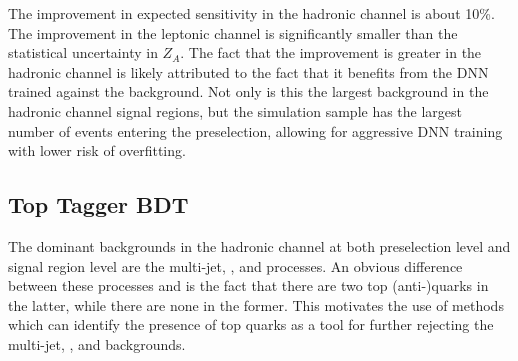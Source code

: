 The improvement in expected sensitivity in the hadronic channel is about 10\%.
The improvement in the leptonic channel is significantly smaller than the statistical uncertainty in $Z_A$.
The fact that the improvement is greater in the hadronic channel is likely attributed to the fact that it benefits from the DNN trained against the \dipho background.
Not only is this the largest background in the \ttH hadronic channel signal regions, but the simulation sample has the largest number of events entering the preselection, allowing for aggressive DNN training with lower risk of overfitting.

\subsection{Top Tagger BDT} \label{sec:tth_top_tagger_bdt}
The dominant backgrounds in the hadronic channel at both preselection level and signal region level are the multi-jet, \gjets, and \dipho processes.
An obvious difference between these processes and \ttH is the fact that there are two top (anti-)quarks in the latter, while there are none in the former.
This motivates the use of methods which can identify the presence of top quarks as a tool for further rejecting the multi-jet, \gjets, and \dipho backgrounds.

